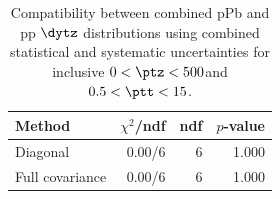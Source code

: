 \begin{table}[htp!]
\centering
\begin{tabular}{|l|r|r|r|}
\hline
Method & $\chi^2$/ndf & ndf & $p$-value \\
\hline
Diagonal & 0.00/6 & 6 & 1.000 \\
Full covariance & 0.00/6 & 6 & 1.000 \\
\hline
\end{tabular}
\caption{Compatibility between combined pPb and pp $\dytz$ distributions using combined statistical and systematic uncertainties for inclusive $0 < \ptz < 500$\GeV and $0.5 < \ptt < 15$\GeV.}
\label{table:chisq_deta}
\end{table}
